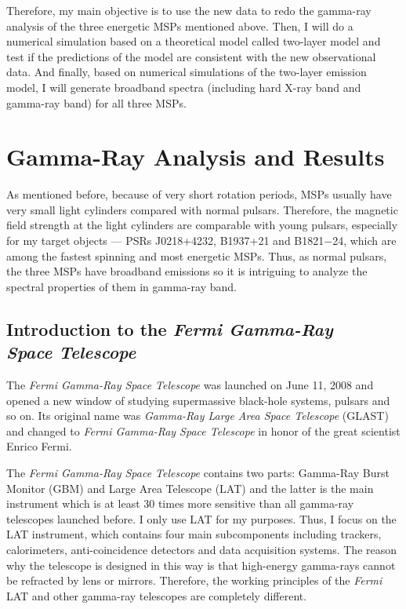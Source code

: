 \documentclass[a4paper, 12pt]{report}
\begin{document}
    Therefore, my main objective is to use the new data to redo the gamma-ray
    analysis of the three energetic MSPs mentioned above. Then, I will do a numerical
    simulation based on a theoretical model called two-layer model and test if the  
    predictions of the model are consistent with the new observational data. And finally, 
    based on numerical simulations of the two-layer emission model, I will generate 
    broadband spectra (including hard X-ray band and gamma-ray band) for all three MSPs. 

    
\chapter{Gamma-Ray Analysis and Results}
  As mentioned before, because of very short rotation periods, MSPs usually have very small 
  light cylinders compared with normal pulsars. Therefore, the magnetic field strength at 
  the light cylinders are comparable with young pulsars, especially for my target objects 
  --- PSRs J0218+4232, B1937+21 and B1821$-$24, which are among the fastest spinning and 
  most energetic MSPs. Thus, as normal pulsars, the three MSPs have broadband emissions so 
  it is intriguing to analyze the spectral properties of them in gamma-ray band.

  \section{Introduction to the \textit{Fermi Gamma-Ray} \\ \textit{Space Telescope}}
    The \textit{Fermi Gamma-Ray Space Telescope} was launched on June 11, 2008 and opened 
    a new window of studying supermassive black-hole systems, pulsars and so on. Its 
    original name was \textit{Gamma-Ray Large Area Space Telescope} (GLAST) and changed 
    to \textit{Fermi Gamma-Ray Space Telescope} in honor of the great scientist Enrico Fermi. 

    The \textit{Fermi Gamma-Ray Space Telescope} contains two parts: 
    Gamma-Ray Burst Monitor (GBM) and Large Area Telescope (LAT) and the 
    latter is the main instrument which is at least 30 times more sensitive than 
    all gamma-ray telescopes launched before. I only use LAT for my purposes. Thus, I 
    focus on the LAT instrument, which contains four main subcomponents including trackers, 
    calorimeters, anti-coincidence detectors and data acquisition systems. The reason why the 
    telescope is designed in this way is that high-energy gamma-rays cannot be refracted by
    lens or mirrors. Therefore, the working principles of the \textit{Fermi} LAT and other 
    gamma-ray telescopes are completely different.
\end{document}
